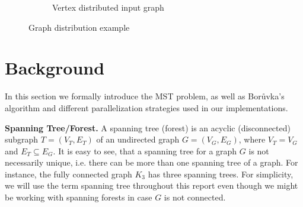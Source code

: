 \documentclass[letterpaper]{article}
\newcommand{\mypar}[1]{{\bf #1.}}
\begin{document}
\begin{figure}
\begin{subfigure}{0.33\textwidth}
    \caption{Vertex distributed input graph}
    \label{fig:work_distribution_vertex_distributed_graph}
  \end{subfigure}
  \caption{Graph distribution example}
  \label{fig:work_distribution}
\end{figure}

\section{Background}
\label{sec:background}
%
%
%
In this section we formally introduce the MST problem, as well as Bor\r{u}vka's algorithm and different parallelization
strategies used in our implementations.

\mypar{Spanning Tree/Forest}
A spanning tree (forest) is an acyclic (disconnected) subgraph $T = (V_T, E_T)$ of an undirected graph $G = (V_G, E_G)$,
where $V_T = V_G$ and $E_T \subseteq E_G$. It is easy to see, that a spanning tree for a graph $G$ is not necessarily
unique, i.e. there can be more than one spanning tree of a graph. For instance, the fully connected graph $K_3$ has
three spanning trees. For simplicity, we will use the term spanning tree throughout this report even though we might be
working with spanning forests in case $G$ is not connected.
\end{document}
